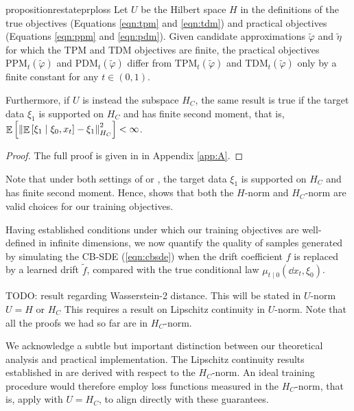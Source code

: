 \begin{restatable}{proposition}{restateprploss}\label{prp:loss}
  Let \(U\) be the Hilbert space \(H\) in the definitions of the true objectives (Equations \ref{eqn:tpm} and \ref{eqn:tdm}) and practical objectives (Equations \ref{eqn:ppm} and \ref{eqn:pdm}). Given candidate approximations \(\widetilde{\varphi}\) and \(\widetilde{\eta}\) for which the TPM and TDM objectives are finite, the practical objectives \(\mathrm{PPM}_{t}(\widetilde{\varphi})\) and \(\mathrm{PDM}_{t}(\widetilde{\varphi})\) differ from \(\mathrm{TPM}_{t}(\widetilde{\varphi})\) and \(\mathrm{TDM}_{t}(\widetilde{\varphi})\) only by a finite constant for any \(t \in (0, 1)\).

  Furthermore, if \(U\) is instead the subspace \(H_{C}\), the same result is true if the target data \(\xi_{1}\) is supported on \(H_{C}\) and has finite second moment, that is, \( \mathop{\mathbb{E}}\qty[\norm{\mathop{\mathbb{E}}\qty[\xi_{1} \mid \xi_{0}, x_{t}] - \xi_{1}}_{H_{C}}^{2}] < \infty\).
\end{restatable}
\begin{proof}
  The full proof is given in  in Appendix \ref{app:A}.
\end{proof}


Note that under both settings of  or , the target data \(\xi_{1}\) is supported on \(H_{C}\) and has finite second moment. Hence,  shows that both the \(H\)-norm and \(H_{C}\)-norm are valid choices for our training objectives.

Having established conditions under which our training objectives are well-defined in infinite dimensions, we now quantify the quality of samples generated by simulating the CB-SDE (\ref{eqn:cbsde}) when the drift coefficient \(f\) is replaced by a learned drift \(\widetilde{f}\), compared with the true conditional law \(\mu_{t \mid 0}(\dd{x_{t}}, \xi_{0})\).

\begin{theorem}
  TODO: result regarding Wasserstein-2 distance. This will be stated in \(U\)-norm \(U = H\) or \(H_{C}\) This requires a result on Lipschitz continuity in \(U\)-norm. Note that all the proofs we had so far are in \(H_{C}\)-norm.
\end{theorem}

We acknowledge a subtle but important distinction between our theoretical analysis and practical implementation. The Lipschitz continuity results established in  are derived with respect to the \(H_{C}\)-norm. An ideal training procedure would therefore employ loss functions measured in the \(H_{C}\)-norm, that is, apply  with \(U = H_{C}\), to align directly with these guarantees.

